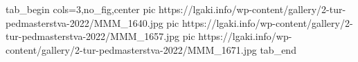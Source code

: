  
 
 
 
 


\ifcmt
  tab_begin cols=3,no_fig,center
     pic https://lgaki.info/wp-content/gallery/2-tur-pedmasterstva-2022/MMM_1640.jpg
		 pic https://lgaki.info/wp-content/gallery/2-tur-pedmasterstva-2022/MMM_1657.jpg
		 pic https://lgaki.info/wp-content/gallery/2-tur-pedmasterstva-2022/MMM_1671.jpg
  tab_end
\fi
